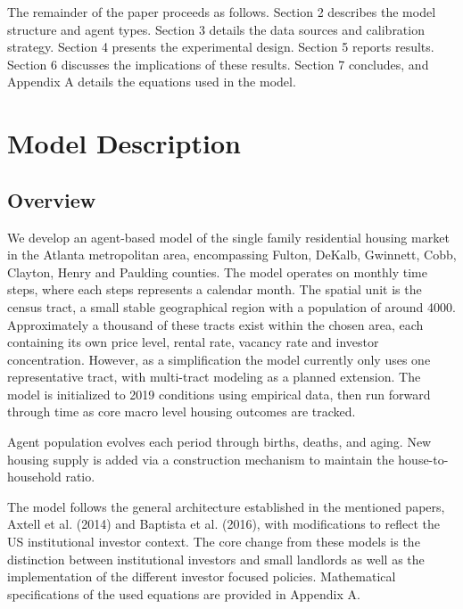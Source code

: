 \documentclass[twocolumn,showpacs,%
  nofootinbib,aps,superscriptaddress,%
  eqsecnum,prd,notitlepage,showkeys,10pt]{revtex4-1}
\begin{document}
The remainder of the paper proceeds as follows. Section 2 describes the model structure and agent types. Section 3 details the data sources and calibration strategy. Section 4 presents the experimental design. Section 5 reports results. Section 6 discusses the implications of these results. Section 7 concludes, and Appendix A details the equations used in the model. 





\section{Model Description}
\label{sec:examples}

\subsection{Overview}

We develop an agent-based model of the single family residential housing market in the Atlanta metropolitan area, encompassing Fulton, DeKalb, Gwinnett, Cobb, Clayton, Henry and Paulding counties. The model operates on monthly time steps, where each steps represents a calendar month. The spatial unit is the census tract, a small stable geographical region with a population of around 4000. Approximately a thousand of these tracts exist within the chosen area, each containing its own price level, rental rate, vacancy rate and investor concentration. However, as a simplification the model currently only uses one representative tract, with multi-tract modeling as a planned extension. The model is initialized to 2019 conditions using empirical data, then run forward through time as core macro level housing outcomes are tracked. \newline

Agent population evolves each period through births, deaths, and aging. New housing supply is added via a construction mechanism to maintain the house-to-household ratio. \newline

The model follows the general architecture established in the mentioned papers, Axtell et al. (2014) and Baptista et al. (2016), with modifications to reflect the US institutional investor context. The core change from these models is the distinction between institutional investors and small landlords as well as the implementation of the different investor focused policies. Mathematical specifications of the used equations are provided in Appendix A. 
\end{document}

